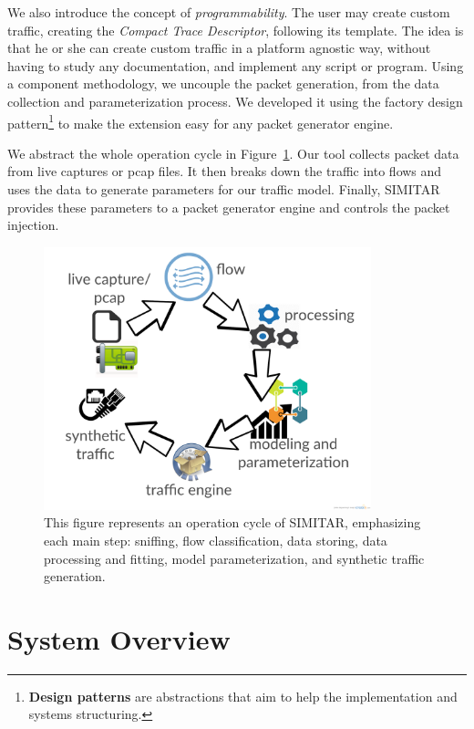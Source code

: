 We also introduce the concept of \textit{programmability}. The user may create custom traffic, creating the \textit{Compact Trace Descriptor}, following its template. The idea is that he or she can create custom traffic in a platform agnostic way, without having to study any documentation, and implement any script or program.  Using a component methodology, we uncouple the packet generation, from the data collection and parameterization process. We developed it using the factory design pattern\footnote{\textbf{Design patterns} are abstractions that aim to help the implementation and systems structuring\cite{web-design-patterns}.} to make the extension easy for any packet generator engine. 

We abstract the whole operation cycle in Figure~\ref{fig:cycle-of-operation}. Our tool collects packet data from live captures or pcap files. It then breaks down the traffic into flows and uses the data to generate parameters for our traffic model. Finally, SIMITAR provides these parameters to a packet generator engine and controls the packet injection.

\begin{figure}[ht!]
        \centering
        \includegraphics[height=3.0in]{figures/ch3/digram-project-cycle}
        \caption{This figure represents an operation cycle of SIMITAR, emphasizing each main step: sniffing, flow classification, data storing, data processing and fitting, model parameterization,  and synthetic traffic generation.}
    \label{fig:cycle-of-operation}
\end{figure}

\section{System  Overview}

